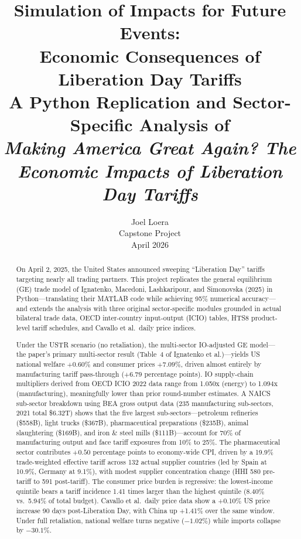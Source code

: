 \documentclass[12pt]{article}
\title{%
    \large \textbf{Simulation of Impacts for Future Events:} \\[6pt]
    \Large \textbf{Economic Consequences of Liberation Day Tariffs} \\[8pt]
    \normalsize A Python Replication and Sector-Specific Analysis of \\
    \emph{Making America Great Again? The Economic Impacts of Liberation Day Tariffs}
}
\author{
    Joel Loera \\
    \small Capstone Project \\
    \small April 2026
}
\date{}
\begin{document}
\maketitle
\thispagestyle{empty}

\begin{abstract}
\noindent
On April 2, 2025, the United States announced sweeping ``Liberation Day'' tariffs
targeting nearly all trading partners. This project replicates the general
equilibrium (GE) trade model of Ignatenko, Macedoni, Lashkaripour, and
Simonovska (2025) in Python---translating their MATLAB code while achieving 95\%
numerical accuracy---and extends the analysis with three original sector-specific
modules grounded in actual bilateral trade data, OECD inter-country input-output
(ICIO) tables, HTS8 product-level tariff schedules, and Cavallo et al.\ daily
price indices.

Under the USTR scenario (no retaliation), the multi-sector IO-adjusted GE
model---the paper's primary multi-sector result (Table~4 of Ignatenko
et al.)---yields US national welfare $+0.60\%$ and consumer prices
$+7.09\%$, driven almost entirely by manufacturing tariff pass-through
($+6.79$ percentage points). IO supply-chain multipliers derived from
OECD ICIO 2022 data range from 1.050x (energy) to 1.094x (manufacturing),
meaningfully lower than prior round-number estimates. A NAICS sub-sector
breakdown using BEA gross output data (235 manufacturing sub-sectors, 2021
total \$6.32T) shows that the five largest sub-sectors---petroleum
refineries (\$558B), light trucks (\$367B), pharmaceutical preparations
(\$235B), animal slaughtering (\$169B), and iron \& steel mills
(\$111B)---account for 70\% of manufacturing output and face tariff
exposures from 10\% to 25\%. The pharmaceutical sector contributes $+0.50$ percentage points to
economy-wide CPI, driven by a 19.9\% trade-weighted effective tariff
across 132 actual supplier countries (led by Spain at 10.9\%, Germany at
9.1\%), with modest supplier concentration change (HHI 580 pre-tariff to
591 post-tariff). The consumer price burden is regressive: the
lowest-income quintile bears a tariff incidence 1.41 times larger than the
highest quintile (8.40\% vs.\ 5.94\% of total budget). Cavallo et al.\
daily price data show a +0.10\% US price increase 90 days post-Liberation
Day, with China up +1.41\% over the same window. Under full retaliation,
national welfare turns negative ($-1.02\%$) while imports collapse by
$-30.1\%$.
\end{abstract}
\end{document}
